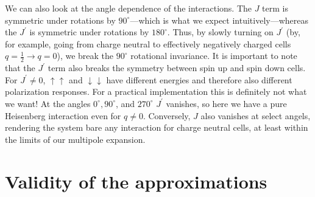 We can also look at the angle dependence of the interactions. The $J$ term is
symmetric under rotations by $90^{\circ}$---which is what we expect
intuitively---whereas the $J^{\prime}$ is symmetric under rotations by
$180^{\circ}$. Thus, by slowly turning on $J^{\prime}$ (by, for example, going
from charge neutral to effectively negatively charged cells $q = \frac{1}{2}
\rightarrow q = 0$), we break the $90^{\circ}$ rotational invariance. It is
important to note that the $J^{\prime}$ term also breaks the symmetry between
spin up and spin down cells. For $J^{\prime} \ne 0$, $\uparrow\uparrow$ and
$\downarrow\downarrow$ have different energies and therefore also different
polarization responses. For a practical implementation this is definitely not
what we want! At the angles $0^{\circ}, 90^{\circ}$, and $270^{\circ}$
$J^{\prime}$ vanishes, so here we have a pure Heisenberg interaction even for $q
\ne 0$. Conversely, $J$ also vanishes at select angels, rendering the system
bare any interaction for charge neutral cells, at least within the limits of our
multipole expansion.


\section{Validity of the approximations}



